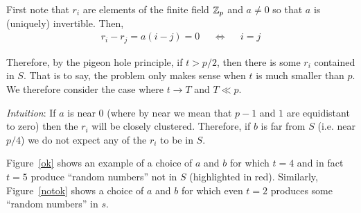 \documentclass[10pt]{article}
\begin{document}
\begin{solution}[Solution]
First note that \( r_i \) are elements of the finite field \( \mathbb{Z}_p \) and \( a\neq 0 \) so that \( a \) is (uniquely) invertible. Then,
\begin{align*}
    r_i - r_j = a(i-j) = 0
    && \Longleftrightarrow &&
    i = j
\end{align*}

Therefore, by the pigeon hole principle, if \( t > p/2 \), then there is some \( r_i \) contained in \( S \). That is to say, the problem only makes sense when \( t  \) is much smaller than \( p \). We therefore consider the case where \( t \to T \) and \( T\ll p \).

    \textit{Intuition}: If \( a \) is near 0 (where by near we mean that \( p-1 \) and \( 1 \) are equidistant to zero) then the \( r_i \) will be closely clustered. Therefore, if \( b \) is far from \( S \) (i.e. near \( p /4 \)) we do not expect any of the \( r_i \) to be in \( S \).

Figure~\ref{ok} shows an example of a choice of \( a \) and \( b \) for which \( t=4 \) and in fact \( t=5 \) produce ``random numbers'' not in \( S \) (highlighted in red). Similarly, Figure~\ref{notok} shows a choice of \( a \) and \( b \) for which even \( t=2 \) produces some ``random numbers'' in \( s \).


\end{solution}
\end{document}
